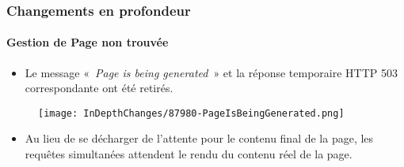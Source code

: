 \begin{frame}[fragile]
	\frametitle{Changements en profondeur}
	\framesubtitle{Gestion de Page non trouvée}

	\begin{itemize}

		\item Le message «~\textit{Page is being generated}~» et la réponse temporaire
			HTTP 503 correspondante ont été retirés.
	\end{itemize}

	\begin{figure}
		\texttt{[image: InDepthChanges/87980-PageIsBeingGenerated.png]}
	\end{figure}

	\begin{itemize}
		\item Au lieu de se décharger de l'attente pour le contenu final de la page,
			les requêtes simultanées attendent le rendu du contenu réel de la page.
	\end{itemize}

\end{frame}


